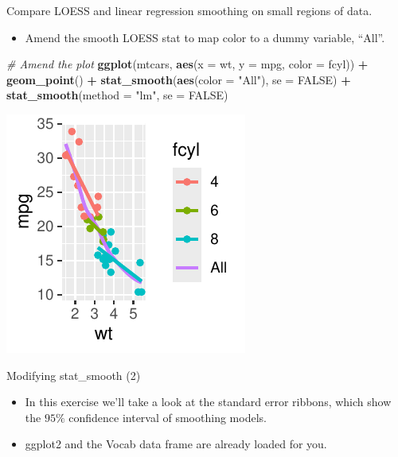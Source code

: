 \documentclass[
  ignorenonframetext,
]{beamer}
\newenvironment{Shaded}{\begin{snugshade}}{\end{snugshade}}
\newcommand{\AttributeTok}[1]{\textcolor[rgb]{0.13,0.29,0.53}{#1}}
\newcommand{\CommentTok}[1]{\textcolor[rgb]{0.56,0.35,0.01}{\textit{#1}}}
\newcommand{\ConstantTok}[1]{\textcolor[rgb]{0.56,0.35,0.01}{#1}}
\newcommand{\FunctionTok}[1]{\textcolor[rgb]{0.13,0.29,0.53}{\textbf{#1}}}
\newcommand{\NormalTok}[1]{#1}
\newcommand{\SpecialCharTok}[1]{\textcolor[rgb]{0.81,0.36,0.00}{\textbf{#1}}}
\newcommand{\StringTok}[1]{\textcolor[rgb]{0.31,0.60,0.02}{#1}}
\providecommand{\tightlist}{%
  \setlength{\itemsep}{0pt}\setlength{\parskip}{0pt}}
\begin{document}
\begin{frame}[fragile]{Compare LOESS and linear regression smoothing on
small regions of data.}
\label{compare-loess-and-linear-regression-smoothing-on-small-regions-of-data.-2}
\begin{itemize}
\tightlist
\item
  Amend the smooth LOESS stat to map color to a dummy variable, ``All''.
\end{itemize}


\begin{Shaded}
\begin{Highlighting}[]
\CommentTok{\# Amend the plot}
\FunctionTok{ggplot}\NormalTok{(mtcars, }\FunctionTok{aes}\NormalTok{(}\AttributeTok{x =}\NormalTok{ wt, }\AttributeTok{y =}\NormalTok{ mpg, }\AttributeTok{color =}\NormalTok{ fcyl)) }\SpecialCharTok{+} \FunctionTok{geom\_point}\NormalTok{() }\SpecialCharTok{+}
    \FunctionTok{stat\_smooth}\NormalTok{(}\FunctionTok{aes}\NormalTok{(}\AttributeTok{color =} \StringTok{"All"}\NormalTok{), }\AttributeTok{se =} \ConstantTok{FALSE}\NormalTok{) }\SpecialCharTok{+} \FunctionTok{stat\_smooth}\NormalTok{(}\AttributeTok{method =} \StringTok{"lm"}\NormalTok{,}
    \AttributeTok{se =} \ConstantTok{FALSE}\NormalTok{)}
\end{Highlighting}
\end{Shaded}

\begin{center}\includegraphics[width=0.5\linewidth]{Figs/unnamed-chunk-13-1} \end{center}
\end{frame}

\begin{frame}{Modifying stat\_smooth (2)}
\label{modifying-stat_smooth-2}
\begin{itemize}
\item
  In this exercise we'll take a look at the standard error ribbons,
  which show the \(95\%\) confidence interval of smoothing models.
\item
  ggplot2 and the Vocab data frame are already loaded for you.
\end{itemize}
\end{frame}
\end{document}
